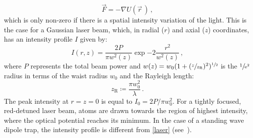 \documentclass[../Thesis-IJspeert.tex]{subfiles}
\begin{document}
\begin{equation}
\vec{F}=-\nabla U(\vec{r}\,)\,,
\end{equation}
which is only non-zero if there is a spatial intensity variation of the light. This is the case for a Gaussian laser beam, which, in radial ($r$) and axial ($z$) coordinates, has an intensity profile $I$ given by:
\begin{equation}
\label{laser}
I(r,z)=\frac{2P}{\pi w^2(z)}\exp{-2\frac{r^2}{w^2(z)}}\,,
\end{equation}
where $P$ represents the total beam power and $w(z)=w_0(1+(\sfrac{z}{z_\mathrm{R}})^2)^{\sfrac{1}{2}}$ is the $\sfrac{1}{\mathrm{e}^2}$ radius in terms of the waist radius $w_0$ and the Rayleigh length:
\begin{equation}
\label{rayleigh}
z_\mathrm{R}\coloneqq\frac{\pi w^2_0}{\lambda}\,.
\end{equation}
The peak intensity at $r=z=0$ is equal to $I_0=2P/\pi w_0^2$. For a tightly focused, red-detuned laser beam, atoms are drawn towards the region of highest intensity, where the optical potential reaches its minimum. In the case of a standing wave dipole trap, the intensity profile is different from \autoref{laser} (see~\cite{Alt2003}).
\end{document}
